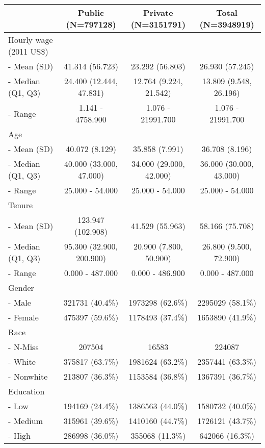 \documentclass[]{article}
\title{}
\author{}
\date{}
\begin{document}
\begin{longtable}[c]{@{}lccc@{}}
\toprule
& Public (N=797128) & Private (N=3151791) & Total
(N=3948919)\tabularnewline
\midrule
\endhead
Hourly wage (2011 US\$) & & &\tabularnewline
- Mean (SD) & 41.314 (56.723) & 23.292 (56.803) & 26.930
(57.245)\tabularnewline
- Median (Q1, Q3) & 24.400 (12.444, 47.831) & 12.764 (9.224, 21.542) &
13.809 (9.548, 26.196)\tabularnewline
- Range & 1.141 - 4758.900 & 1.076 - 21991.700 & 1.076 -
21991.700\tabularnewline
Age & & &\tabularnewline
- Mean (SD) & 40.072 (8.129) & 35.858 (7.991) & 36.708
(8.196)\tabularnewline
- Median (Q1, Q3) & 40.000 (33.000, 47.000) & 34.000 (29.000, 42.000) &
36.000 (30.000, 43.000)\tabularnewline
- Range & 25.000 - 54.000 & 25.000 - 54.000 & 25.000 -
54.000\tabularnewline
Tenure & & &\tabularnewline
- Mean (SD) & 123.947 (102.908) & 41.529 (55.963) & 58.166
(75.708)\tabularnewline
- Median (Q1, Q3) & 95.300 (32.900, 200.900) & 20.900 (7.800, 50.900) &
26.800 (9.500, 72.900)\tabularnewline
- Range & 0.000 - 487.000 & 0.000 - 486.900 & 0.000 -
487.000\tabularnewline
Gender & & &\tabularnewline
- Male & 321731 (40.4\%) & 1973298 (62.6\%) & 2295029
(58.1\%)\tabularnewline
- Female & 475397 (59.6\%) & 1178493 (37.4\%) & 1653890
(41.9\%)\tabularnewline
Race & & &\tabularnewline
- N-Miss & 207504 & 16583 & 224087\tabularnewline
- White & 375817 (63.7\%) & 1981624 (63.2\%) & 2357441
(63.3\%)\tabularnewline
- Nonwhite & 213807 (36.3\%) & 1153584 (36.8\%) & 1367391
(36.7\%)\tabularnewline
Education & & &\tabularnewline
- Low & 194169 (24.4\%) & 1386563 (44.0\%) & 1580732
(40.0\%)\tabularnewline
- Medium & 315961 (39.6\%) & 1410160 (44.7\%) & 1726121
(43.7\%)\tabularnewline
- High & 286998 (36.0\%) & 355068 (11.3\%) & 642066
(16.3\%)\tabularnewline
\bottomrule
\end{longtable}
\end{document}

